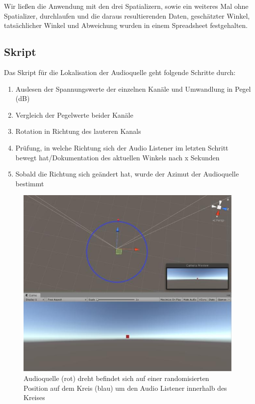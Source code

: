 \documentclass[12pt,a4paper]{article}
\begin{document}
Wir ließen die Anwendung mit den drei Spatializern, sowie ein weiteres Mal ohne Spatializer, durchlaufen und die daraus resultierenden Daten, geschätzter Winkel, tatsächlicher Winkel und Abweichung wurden in einem Spreadsheet festgehalten.

\subsection{Skript}
Das Skript für die Lokalisation der Audioquelle geht folgende Schritte durch:
\begin{enumerate}
\item Auslesen der Spannungswerte der einzelnen Kanäle und Umwandlung in Pegel (dB)
\item Vergleich der Pegelwerte beider Kanäle
\item Rotation in Richtung des lauteren Kanals
\item Prüfung, in welche Richtung sich der Audio Listener im letzten Schritt bewegt hat/Dokumentation des aktuellen Winkels nach x Sekunden

\item Sobald die Richtung sich geändert hat, wurde der Azimut der Audioquelle bestimmt
\end{enumerate}

\begin{figure}[h!]
\centering
\includegraphics[scale=0.5]{setup1}
\caption{Audioquelle (rot) dreht befindet sich auf einer randomisierten Position auf dem Kreis (blau) um den Audio Listener innerhalb des Kreises}
\end{figure}
\end{document}

